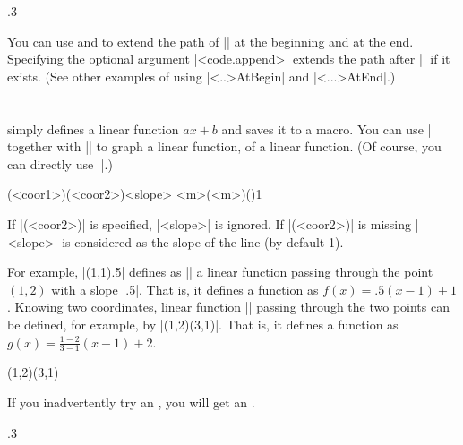 \begin{tzcode}{.3}
\end{tzcode}


You can use \icmd{\tzLFnofyAtBegin} and \icmd{\tzLFnofyAtEnd} to extend the path of |\tzLFnofy| at the beginning and at the end. Specifying the optional argument |<code.append>| extends the path after |\tzLFnofyAtEnd| if it exists.
(See other examples of using |\tz<..>AtBegin| and |\tz<...>AtEnd|.)


\section{\protect\cmd{\tzdefLFn}}
\label{s:tzdefLFn}

\icmd{\tzdefLFn} simply defines a linear function $ax+b$ and saves it to a macro.
You can use |\tzdefLFn| together with |\tzfn| to graph a linear function,  of a linear function.
(Of course, you can directly use |\tzLFn|.)

\begin{tzdef}{}
(<coor1>)(<coor2>){<slope>}
{<m>}(<m>)(){1}
\end{tzdef}

If |(<coor2>)| is specified, |{<slope>}| is ignored.
If |(<coor2>)| is missing |<slope>| is considered as the slope of the line (by default 1). 

For example, |\tzdefLFn{\Gx}(1,1){.5}| defines as |\Gx| a linear function passing through the point $(1,2)$ with a slope |.5|.
That is, it defines a function as $f(x)=.5(x-1)+1$.
Knowing two coordinates, linear function |\Gx| passing through the two points can be defined, for example, by |\tzdefLFn{\Gx}(1,2)(3,1)|.
That is, it defines a function as $g(x)=\frac{1-2}{3-1}(x-1)+2$.


\begin{tztikz}{}
\tzdefLFn{\Fx}(1,2)(3,1) %
  \def\Fx{-1/2*(\x-1)+2}
\end{tztikz}

\remark If you inadvertently try an , you will get an .


\begin{tzcode}{.3}
{}
\end{tzcode}


